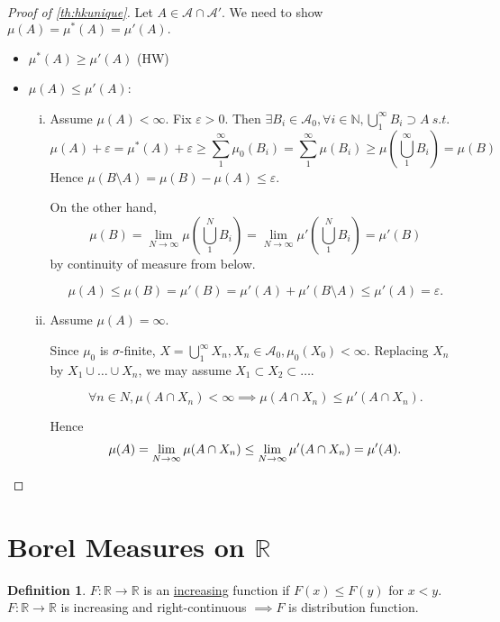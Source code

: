 \documentclass{report}
\newcommand{\R}{\mathbb{R}}
\newcommand{\N}{\mathbb{N}}
\newcommand{\st}{\ s.t.\ }
\theoremstyle{definition}
\newtheorem{definition}[theorem]{Definition}
\theoremstyle{remark}
\newcommand*\ttlmath[2]{\texorpdfstring{$\boldsymbol{#1}$}{#2}}
\begin{document}
\begin{proof}[Proof of \ref{th:hkunique}]
Let $A \in \mathcal{A} \cap \mathcal{A}'$. We need to show $\mu(A) = \mu^*(A) = \mu'(A).$
\begin{itemize}
\item
$\mu^*(A) \geq \mu'(A)$ (HW)

\item
$\mu(A) \leq \mu'(A)$:
\begin{enumerate}[(i)]
\item Assume $\mu(A) < \infty.$ Fix $\varepsilon > 0$. Then $\exists B_i \in \mathcal{A}_0, \forall i \in \N, \bigcup_1^\infty B_i \supset A \st$
\[
\mu(A) + \varepsilon = \mu^*(A) + \varepsilon \geq \sum_1^\infty \mu_0(B_i) = \sum_1^\infty \mu(B_i) \geq \mu \left(\bigcup_1^\infty B_i\right) = \mu(B)
\]
Hence $\mu(B \setminus A) = \mu(B) - \mu(A) \leq \varepsilon.$

On the other hand, 
\[
\mu(B) = \lim_{N \to \infty} \mu\left(\bigcup_1^N B_i\right) = \lim_{N \to \infty} \mu'\left(\bigcup_1^N B_i\right) = \mu'(B)
\]
by continuity of measure from below.

\[
\mu(A) \leq \mu(B) = \mu'(B) = \mu'(A) + \mu'(B \setminus A) \leq \mu'(A) = \varepsilon.
\]
\item
Assume $\mu(A) = \infty.$

Since $\mu_0$ is $\sigma$-finite, $X = \bigcup_1^\infty X_n, X_n \in \mathcal{A}_0, \mu_0(X_0) < \infty.$
Replacing $X_n$ by $X_1 \cup \ldots \cup X_n$, we may assume $X_1 \subset X_2 \subset \ldots$.

\[\forall n \in N, \mu(A \cap X_n) < \infty \implies \mu(A \cap X_n) \leq \mu'(A \cap X_n).\]

Hence
\[
\mu(A) = \lim_{N \to \infty} \mu(A \cap X_n) \leq \lim_{N \to \infty} \mu'(A \cap X_n) = \mu'(A). \qedhere
\]
\end{enumerate}
\end{itemize}
\end{proof}

\section{Borel Measures on \ttlmath{\R}{Reals}}
\begin{definition}
$F: \R \to \R$ is an \underline{increasing} function if $F(x) \leq F(y)$ for $x < y$.
$F: \R \to \R$ is increasing and right-continuous $\implies F$ is distribution function. 
\end{definition}
\end{document}
